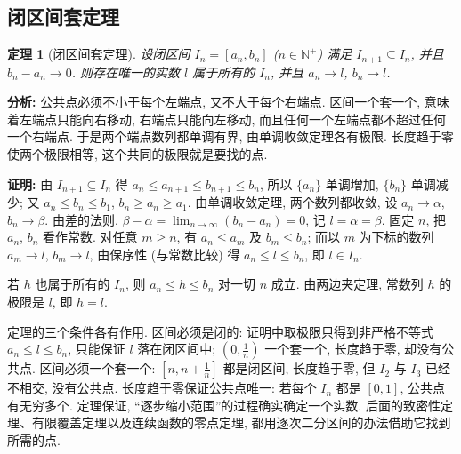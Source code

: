\documentclass[UTF8,openany]{ctexbook}
\theoremstyle{chinesetextbook}
\newtheorem{theorem}{定理}[section]
\newenvironment{cnproof}{\par\indent\textbf{证明:} \ignorespaces}{\par}
\begin{document}
\subsection{闭区间套定理}
\begin{theorem}[闭区间套定理]
设闭区间 $I_n=[a_n,b_n]$ ($n\in\mathbb N^+$) 满足 $I_{n+1}\subseteq I_n$, 并且 $b_n-a_n\to0$. 则存在唯一的实数 $l$ 属于所有的 $I_n$, 并且 $a_n\to l$, $b_n\to l$.
\end{theorem}
\par\indent\textbf{分析:} 公共点必须不小于每个左端点, 又不大于每个右端点. 区间一个套一个, 意味着左端点只能向右移动, 右端点只能向左移动, 而且任何一个左端点都不超过任何一个右端点. 于是两个端点数列都单调有界, 由单调收敛定理各有极限. 长度趋于零使两个极限相等, 这个共同的极限就是要找的点.
\begin{cnproof}
由 $I_{n+1}\subseteq I_n$ 得 $a_n\le a_{n+1}\le b_{n+1}\le b_n$, 所以 $\{a_n\}$ 单调增加, $\{b_n\}$ 单调减少; 又 $a_n\le b_n\le b_1$, $b_n\ge a_n\ge a_1$. 由单调收敛定理, 两个数列都收敛, 设 $a_n\to\alpha$, $b_n\to\beta$. 由差的法则, $\displaystyle\beta-\alpha=\lim_{n\to\infty}(b_n-a_n)=0$, 记 $l=\alpha=\beta$. 固定 $n$, 把 $a_n$, $b_n$ 看作常数. 对任意 $m\ge n$, 有 $a_n\le a_m$ 及 $b_m\le b_n$; 而以 $m$ 为下标的数列 $a_m\to l$, $b_m\to l$, 由保序性 (与常数比较) 得 $a_n\le l\le b_n$, 即 $l\in I_n$.

若 $h$ 也属于所有的 $I_n$, 则 $a_n\le h\le b_n$ 对一切 $n$ 成立. 由两边夹定理, 常数列 $h$ 的极限是 $l$, 即 $h=l$.
\end{cnproof}
定理的三个条件各有作用. 区间必须是闭的: 证明中取极限只得到非严格不等式 $a_n\le l\le b_n$, 只能保证 $l$ 落在闭区间中; $\displaystyle\left(0,\frac1n\right)$ 一个套一个, 长度趋于零, 却没有公共点. 区间必须一个套一个: $\displaystyle\left[n,n+\frac1n\right]$ 都是闭区间, 长度趋于零, 但 $I_2$ 与 $I_3$ 已经不相交, 没有公共点. 长度趋于零保证公共点唯一: 若每个 $I_n$ 都是 $[0,1]$, 公共点有无穷多个. 定理保证, “逐步缩小范围”的过程确实确定一个实数. 后面的致密性定理、有限覆盖定理以及连续函数的零点定理, 都用逐次二分区间的办法借助它找到所需的点.
\end{document}
